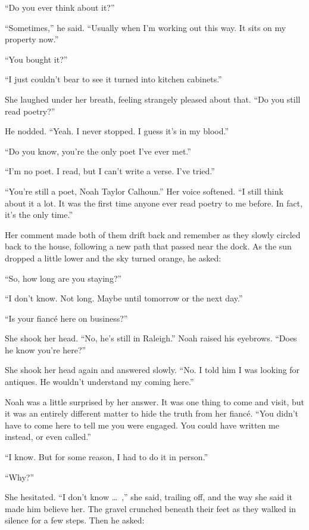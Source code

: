 \documentclass[10pt, twoside, openright]{book}
\begin{document}
``Do you ever think about it?''


``Sometimes,'' he said. ``Usually when I'm working out this way. It sits
on my property now.''


``You bought it?''

``I just couldn't bear to see it turned into kitchen cabinets.''


She laughed under her breath, feeling strangely pleased about that. ``Do
you still read poetry?''


He nodded. ``Yeah. I never stopped. I guess it's in my blood.''

``Do you know, you're the only poet I've ever met.''

``I'm no poet. I read, but I can't write a verse. I've tried.''


``You're still a poet, Noah Taylor Calhoun.'' Her voice softened. ``I
still think about it a lot. It was the first time anyone ever read
poetry to me before. In fact, it's the only time.''

Her comment made both of them drift back and remember as they slowly
circled back to the house, following a new path that passed near the
dock. As the sun dropped a little lower and the sky turned orange, he
asked:


``So, how long are you staying?''

``I don't know. Not long. Maybe until tomorrow or the next day.''

``Is your fiancé here on business?''


She shook her head. ``No, he's still in Raleigh.'' Noah raised his
eyebrows. ``Does he know you're here?''

She shook her head again and answered slowly. ``No. I told him I was
looking for antiques. He wouldn't understand my coming here.''

Noah was a little surprised by her answer. It was one thing to come and
visit, but it was an entirely different matter to hide the truth from
her fiancé. ``You didn't have to come here to tell me you were engaged.
You could have written me instead, or even called.''


``I know. But for some reason, I had to do it in person.''

``Why?''


She hesitated. ``I don't know   \dots\ ,'' she said, trailing off, and the
way she said it made him believe her. The gravel crunched beneath their
feet as they walked in silence for a few steps. Then he asked:
\end{document}
